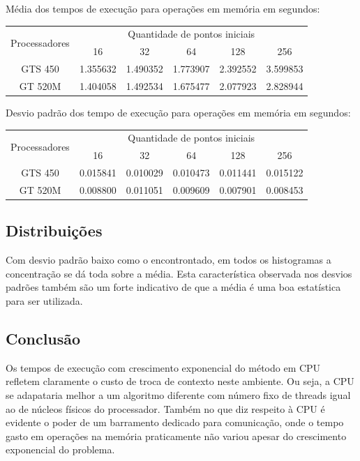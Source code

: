     \hspace{1mm}\newline
    
    \noindent Média dos tempos de execução para operações em memória em segundos:\\
    \begin{tabular}{| c | c | c | c | c | c |}
      \hline
      \multirow{2}{*}{Processadores}& \multicolumn{5}{|c|}{Quantidade de pontos iniciais} \\ \cline{2-6}
      & 16 & 32 & 64 & 128 & 256 \\ \hline
      GTS 450 & 1.355632 & 1.490352 & 1.773907 & 2.392552 & 3.599853\\ \hline
      GT 520M & 1.404058 & 1.492534 & 1.675477 & 2.077923 & 2.828944\\ \hline

      \hline
    \end{tabular}
    
    \hspace{1mm}\newline
    
    \noindent Desvio padrão dos tempo de execução para operações em memória em segundos:\\
    \begin{tabular}{| c | c | c | c | c | c |}
      \hline
      \multirow{2}{*}{Processadores}& \multicolumn{5}{|c|}{Quantidade de pontos iniciais} \\ \cline{2-6}
      & 16 & 32 & 64 & 128 & 256 \\ \hline
      GTS 450 & 0.015841 & 0.010029 & 0.010473 & 0.011441 & 0.015122 \\ \hline
      GT 520M & 0.008800 & 0.011051 & 0.009609 & 0.007901 & 0.008453 \\ \hline

      \hline
    \end{tabular}
    
  \subsection{Distribuições}
    Com desvio padrão baixo como o encontrontado, em todos os histogramas a concentração se dá toda sobre a média. Esta característica observada nos desvios padrões também são um forte indicativo de que a média é uma boa estatística para ser utilizada.    
  
  \subsection{Conclusão}
  Os tempos de execução com crescimento exponencial do método em CPU refletem claramente o custo de troca de contexto neste ambiente. Ou seja, a CPU se adapataria melhor a um algoritmo diferente com número fixo de threads igual ao de núcleos físicos do processador. Também no que diz respeito à CPU é evidente o poder de um barramento dedicado para comunicação, onde o tempo gasto em operações na memória praticamente não variou apesar do crescimento exponencial do problema.
  
